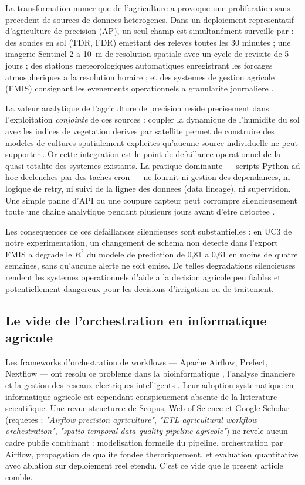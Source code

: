 \documentclass[12pt,a4paper]{article}
\theoremstyle{plain}
\theoremstyle{definition}
\theoremstyle{remark}
\begin{document}
	La transformation numerique de l'agriculture a provoque une proliferation
	sans precedent de sources de donnees heterogenes. Dans un deploiement
	representatif d'agriculture de precision (AP), un seul champ est
	simultanément surveille par : des sondes en sol (TDR, FDR) emettant
	des releves toutes les 30 minutes ; une imagerie Sentinel-2 a 10~m de
	resolution spatiale avec un cycle de revisite de 5 jours ; des stations
	meteorologiques automatiques enregistrant les forcages atmospheriques a
	la resolution horaire ; et des systemes de gestion agricole (FMIS)
	consignant les evenements operationnels a granularite journaliere
	\cite{iot_review_2025,smart_sensors_2024}.
	
	La valeur analytique de l'agriculture de precision reside precisement dans
	l'exploitation \emph{conjointe} de ces sources : coupler la dynamique de
	l'humidite du sol avec les indices de vegetation derives par satellite
	permet de construire des modeles de cultures spatialement explicites
	qu'aucune source individuelle ne peut supporter
	\cite{ndvi_sentinel2_2023,ndvi_timeseries_2022}.
	Or cette integration est le point de defaillance operationnel de la
	quasi-totalite des systemes existants. La pratique dominante --- scripts
	Python ad hoc declenches par des taches cron --- ne fournit ni gestion
	des dependances, ni logique de retry, ni suivi de la lignee des donnees
	(data lineage), ni supervision. Une simple panne d'API ou une coupure
	capteur peut corrompre silencieusement toute une chaine analytique
	pendant plusieurs jours avant d'etre detoctee
	\cite{pipeline_survey_2024}.
	
	Les consequences de ces defaillances silencieuses sont substantielles :
	en UC3 de notre experimentation, un changement de schema non detecte dans
	l'export FMIS a degrade le $R^2$ du modele de prediction de 0,81 a 0,61
	en moins de quatre semaines, sans qu'aucune alerte ne soit emise.
	De telles degradations silencieuses rendent les systemes operationnels
	d'aide a la decision agricole peu fiables et potentiellement dangereux
	pour les decisions d'irrigation ou de traitement.
	
	\subsection{Le vide de l'orchestration en informatique agricole}
	
	Les frameworks d'orchestration de workflows --- Apache Airflow, Prefect,
	Nextflow --- ont resolu ce probleme dans la bioinformatique
	\cite{bioinformatics_workflow}, l'analyse financiere et la gestion des
	reseaux electriques intelligents \cite{smartgrid_etl}. Leur adoption
	systematique en informatique agricole est cependant conspicuement absente
	de la litterature scientifique. Une revue structuree de Scopus, Web of
	Science et Google Scholar (requetes :
	\textit{"Airflow precision agriculture"},
	\textit{"ETL agricultural workflow orchestration"},
	\textit{"spatio-temporal data quality pipeline agricole"})
	ne revele aucun cadre publie combinant : modelisation formelle du pipeline,
	orchestration par Airflow, propagation de qualite fondee theroriquement,
	et evaluation quantitative avec ablation sur deploiement reel etendu.
	C'est ce vide que le present article comble.
	
\end{document}
